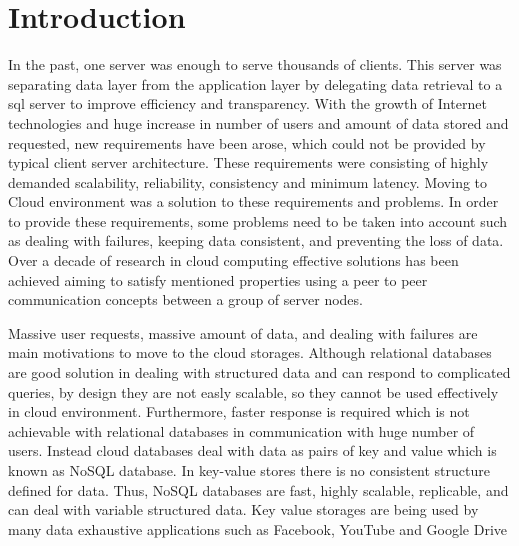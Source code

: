 \documentclass{sig-alternate}
\begin{document}
%


\section{Introduction}

In the past, one server was enough to serve thousands of clients. This server was separating data layer from the application layer by delegating data retrieval to a sql server to improve efficiency and transparency. With the growth of Internet technologies and huge increase in number of users and amount of data stored and requested, new requirements have been arose, which could not be provided by typical client server architecture. These requirements were consisting of highly demanded scalability, reliability, consistency and minimum latency. Moving to Cloud environment was a solution to these requirements and problems. In order to provide these requirements, some problems need to be taken into account such as dealing with failures, keeping data consistent, and preventing the loss of data.%
Over a decade of research in cloud computing effective solutions has been achieved aiming to satisfy mentioned properties using a peer to peer communication concepts between a group of server nodes. 


Massive user requests, massive amount of data, and dealing with failures are main motivations to move to the cloud storages. Although relational databases are good solution in dealing with structured data and can respond to complicated queries, by design they are not easly scalable, so they cannot be used effectively in cloud environment. Furthermore, faster response is required which is not achievable with relational databases in communication with huge number of users. Instead cloud databases deal with data as pairs of key and value which is known as NoSQL database. In key-value stores there is no consistent structure defined for data. Thus, NoSQL databases are fast, highly scalable, replicable, and can deal with variable structured data. Key value storages are being used by many data exhaustive applications such as Facebook, YouTube and Google Drive
\end{document}
